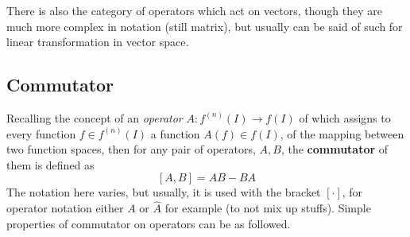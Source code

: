 There is also the category of operators which act on vectors, though they are much more complex in notation (still matrix), but usually can be said of such for linear transformation in vector space. 

\subsection{Commutator}

Recalling the concept of an \textit{operator} $A: f^{(n)}(I)\to f(I)$ of which assigns to every function $f\in f^{(n)}(I)$ a function $A(f)\in f(I)$, of the mapping between two function spaces, then for any pair of operators, $A, B$, the \textbf{commutator} of them is defined as 
\begin{equation}
    \left[ A,B \right] = AB - BA
\end{equation}
The notation here varies, but usually, it is used with the bracket $\left[\cdot\right]$, for operator notation either $A$ or $\hat{A}$ for example (to not mix up stuffs). Simple properties of commutator on operators can be as followed. 

